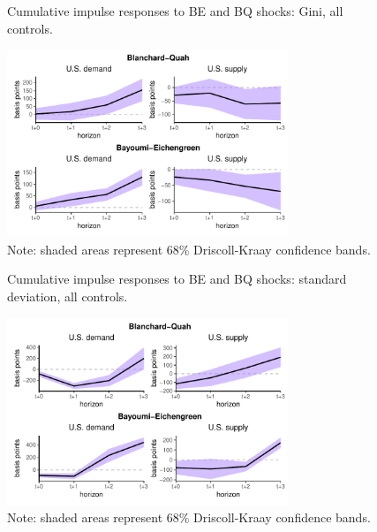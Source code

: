 \documentclass[12pt, a4paper]{article}
\begin{document}
\begin{figure}[H]
    \centering    
    \caption{Cumulative impulse responses to BE and BQ shocks: Gini, all controls.}  
    \label{fig:bqbe_gini}
    \includegraphics[width=0.75\textwidth]{Figures/robust_BQBE_demand_supply_LP.pdf}
    \centering \caption*{Note: shaded areas represent 68\% Driscoll-Kraay confidence bands.}
\end{figure}

\begin{figure}[H]
    \centering    
    \caption{Cumulative impulse responses to BE and BQ shocks: standard deviation, all controls.}  
    \label{fig:bqbe_std}
    \includegraphics[width=0.75\textwidth]{Figures/robust_std_BQBE_demand_supply_LP.pdf}
    \centering \caption*{Note: shaded areas represent 68\% Driscoll-Kraay confidence bands.}
\end{figure}
\end{document}
